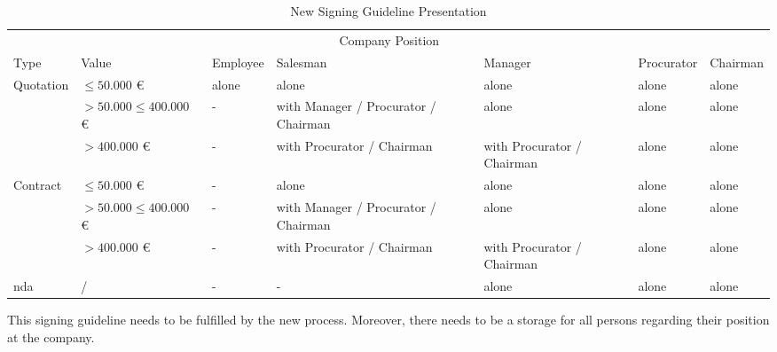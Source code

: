 \begin{table}[h!]
	\begin{tabular}{|p{1.5cm}|p{2cm}|p{2cm}|p{2cm}|p{2cm}|p{2cm}|p{2cm}|} \hline
		\rowcolor{Gray} \multicolumn{2}{|c|}{Document} & \multicolumn{5}{c|}{Company Position}\\ 
		Type & Value & Employee & Salesman & Manager & Procurator & Chairman \\ \hline
		\multirow{3}{1.5cm}{Quotation} & $ \leq 50.000 $ \euro & alone & alone & alone & alone & alone \\ \cline{2-7}
		& $ > 50.000 \leq 400.000 $ \euro & - & with Manager / Procurator / Chairman & alone & alone & alone \\ \cline{2-7}
		& $ > 400.000 $ \euro & - & with Procurator / Chairman & with Procurator / Chairman & alone & alone \\ \hline
		\multirow{3}{1.5cm}{Contract} & $ \leq 50.000 $ \euro & - & alone & alone & alone & alone \\ \cline{2-7}
		& $ > 50.000 \leq 400.000 $ \euro & - & with Manager / Procurator / Chairman & alone & alone & alone \\ \cline{2-7}
		& $ > 400.000 $ \euro & - & with Procurator / Chairman
		& with Procurator / Chairman & alone & alone \\ \hline
		\Gls{nda} & / & - & - & alone & alone & alone \\ \hline
	\end{tabular}
	\centering
	\caption{New Signing Guideline Presentation}
	\label{tab:newSigningGuideline}
\end{table}

This signing guideline needs to be fulfilled by the new process. Moreover, there needs to be a storage for all persons regarding their position at the company. 

